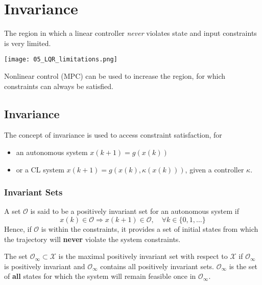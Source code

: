 \section{Invariance}

The region in which a linear controller \textit{never} violates state and input constraints is very limited.
\begin{center}
    \texttt{[image: 05\_LQR\_limitations.png]}
\end{center}
Nonlinear control (MPC) can be used to increase the region, for which constraints can always be satisfied.

\subsection{Invariance}
The concept of invariance is used to access constraint satisfaction, for
\begin{itemize}
    \item an autonomous system $x(k + 1) = g(x(k))$
    \item or a CL system $x(k + 1) = g(x(k), \kappa(x(k)))$, given a controller $\kappa$.
\end{itemize}

\subsubsection{Invariant Sets}

A set $\mathcal{O}$ is said to be a positively invariant set for an autonomous system if
\begin{equation*}
    x(k) \in \mathcal{O} \Rightarrow x(k + 1) \in \mathcal{O}, \quad \forall k \in \{0, 1, \dots \}
\end{equation*}
Hence, if $\mathcal{O}$ is within the constraints, it provides a set of initial states from which the trajectory will \textbf{never} violate the system constraints.

\newpar{}

The set $\mathcal{O}_\infty \subset \mathcal{X}$ is the maximal positively invariant set with respect to $\mathcal{X}$ if $\mathcal{O}_\infty$ is positively invariant and $\mathcal{O}_\infty$ contains all positively invariant sets.
\newpar{}
$\mathcal{O}_\infty$ is the set of \textbf{all} states for which the system will remain feasible once in $\mathcal{O}_\infty$.

